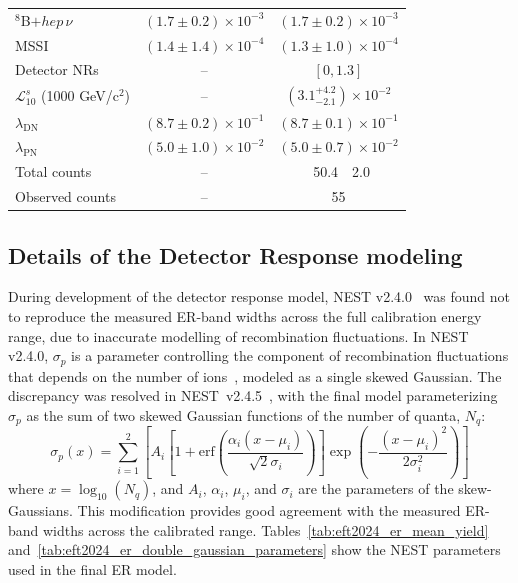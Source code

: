 \begin{table}[ht]
\begin{tabular}{l
            r@{$\,\pm\,$}l
            r@{$\,\pm\,$}l}
     $^{8}$B$+hep\,\nu$              & \multicolumn{2}{c}{$(1.7 \pm 0.2) \times 10^{-3}$} & \multicolumn{2}{c}{$(1.7 \pm 0.2) \times 10^{-3}$} \\
     MSSI                            & \multicolumn{2}{c}{$(1.4 \pm 1.4) \times 10^{-4}$} & \multicolumn{2}{c}{$(1.3 \pm 1.0) \times 10^{-4}$} \\
     Detector NRs                    & \multicolumn{2}{c}{--} & \multicolumn{2}{c}{$[0, 1.3]$}$\,\,\,\,\,\,\,\,\,\,\,\,\,\,\,\,$ \\
     $\mathcal{L}_{10}^s$ (1000 GeV/c$^2$)                & \multicolumn{2}{c}{--} & \multicolumn{2}{c}{$\left(3.1^{+4.2}_{-2.1}\right) \times 10^{-2}$} \\
     \hline
     $\lambda_{\text{DN}}$           & \multicolumn{2}{c}{$(8.7 \pm 0.2) \times 10^{-1}$} & \multicolumn{2}{c}{$(8.7 \pm 0.1) \times 10^{-1}$} \\
     $\lambda_{\text{PN}}$           & \multicolumn{2}{c}{$(5.0 \pm 1.0) \times 10^{-2}$} & \multicolumn{2}{c}{$(5.0 \pm 0.7) \times 10^{-2}$} \\ \hline
     \hline
     Total counts                    & \multicolumn{2}{c}{--} & 50.4 & 2.0 \\
     \hline
     Observed counts                 & \multicolumn{2}{c}{--} & \multicolumn{2}{c}{55} $\,\,\,\,\,\,\,\,\,\,\,\,\,\,\,$\\
     \hline \hline
    \end{tabular}
    \label{tab:delayed_sample_fit_table} 
\end{table}

\subsection{Details of the Detector Response modeling}

During development of the detector response model, NEST v2.4.0~\cite{nest_v2_4_0} was found not to reproduce the measured ER-band widths across the full calibration energy range, due to inaccurate modelling of recombination fluctuations. In NEST v2.4.0, $\sigma_p$ is a parameter controlling the component of recombination fluctuations that depends on the  number of ions~\cite{NEST:paper_2023}, modeled as a single skewed Gaussian. The discrepancy was resolved in NEST~v2.4.5~\cite{nest_v2_4_5}, with
the final model parameterizing $\sigma_p$ as the sum of two skewed Gaussian functions of the number of quanta, $N_q$:
\begin{equation}
    \sigma_p(x) = \sum_{i=1}^2 \left[A_i\left[1 + \mathrm{erf}\left(\frac{\alpha_i (x - \mu_i) }{\sqrt{2}\sigma_i}\right)\right]\exp\left(-\frac{(x-\mu_i)^2}{2\sigma_i^2}\right)\right] 
\end{equation}
where $x = \log_{10}(N_q)$, and $A_i$, $\alpha_i$, $\mu_i$, and $\sigma_i$ are the parameters of the skew-Gaussians. This modification provides good agreement with the measured ER-band widths across the calibrated range. Tables~\ref{tab:eft2024_er_mean_yield} and~\ref{tab:eft2024_er_double_gaussian_parameters} show the NEST parameters used in the final ER model. 

